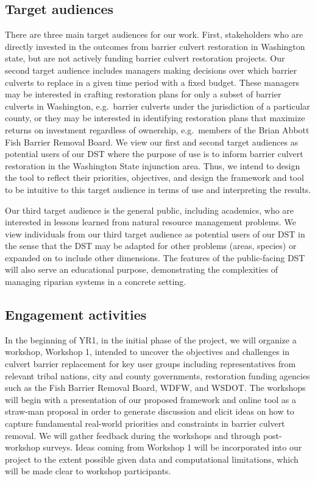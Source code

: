 \documentclass[12pt]{elsarticle}
\begin{document}
\subsection*{Target audiences}

There are three main target audiences for our work. First, stakeholders who are directly invested in the outcomes from barrier culvert restoration in Washington state, but are not actively funding barrier culvert restoration projects. Our second target audience includes managers making decisions over which barrier culverts to replace in a given time period with a fixed budget. These managers may be interested in crafting restoration plans for only a subset of barrier culverts in Washington, e.g.\ barrier culverts under the jurisdiction of a particular county, or they may be interested in identifying restoration plans that maximize returns on investment regardless of ownership, e.g.\ members of the Brian Abbott Fish Barrier Removal Board. We view our first and second target audiences as potential users of our DST where the purpose of use is to inform barrier culvert restoration in the Washington State injunction area. Thus, we intend to design the tool to reflect their priorities, objectives, and design the framework and tool to be intuitive to this target audience in terms of use and interpreting the results.

Our third target audience is the general public, including academics, who are interested in lessons learned from natural resource management problems. We view individuals from our third target audience as potential users of our DST in the sense that the DST may be adapted for other problems (areas, species) or expanded on to include other dimensions. The features of the public-facing DST will also serve an educational purpose, demonstrating the complexities of managing riparian systems in a concrete setting. 

\subsection*{Engagement activities}

In the beginning of YR1, in the initial phase of the project, we will organize a workshop, Workshop 1, intended to uncover the objectives and challenges in culvert barrier replacement for key user groups including representatives from relevant tribal nations, city and county governments, restoration funding agencies such as the Fish Barrier Removal Board, WDFW, and WSDOT. The workshops will begin with a presentation of our proposed framework and online tool as a straw-man proposal in order to generate discussion and elicit ideas on how to capture fundamental real-world priorities and constraints in barrier culvert removal. We will gather feedback during the workshops and through post-workshop surveys. Ideas coming from Workshop 1 will be incorporated into our project to the extent possible given data and computational limitations, which will be made clear to workshop participants.
\end{document}
